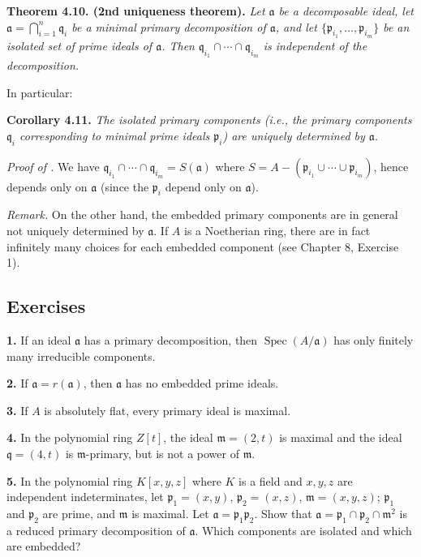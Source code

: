 \noindent\textbf{Theorem 4.10. (2nd uniqueness theorem).} \emph{Let \(\mathfrak a\) be a decomposable ideal, let \(\mathfrak a=\bigcap_{i=1}^n\mathfrak q_i\) be a minimal primary decomposition of \(\mathfrak a\), and let \(\{\mathfrak p_{i_1},\ldots,\mathfrak p_{i_m}\}\) be an isolated set of prime ideals of \(\mathfrak a\). Then \(\mathfrak q_{i_1}\cap\cdots\cap\mathfrak q_{i_m}\) is independent of the decomposition.}

In particular:

\noindent\textbf{Corollary 4.11.} \emph{The isolated primary components (i.e., the primary components \(\mathfrak q_i\) corresponding to minimal prime ideals \(\mathfrak p_i\)) are uniquely determined by \(\mathfrak a\).}

\noindent\emph{Proof of .} We have \(\mathfrak q_{i_1}\cap\cdots\cap\mathfrak q_{i_m}=S(\mathfrak a)\) where \(S=A-(\mathfrak p_{i_1}\cup\cdots\cup\mathfrak p_{i_m})\), hence depends only on \(\mathfrak a\) (since the \(\mathfrak p_i\) depend only on \(\mathfrak a\)). \proofbox

\noindent\emph{Remark.} On the other hand, the embedded primary components are in general not uniquely determined by \(\mathfrak a\). If \(A\) is a Noetherian ring, there are in fact infinitely many choices for each embedded component (see Chapter 8, Exercise 1).

\subsection{Exercises}

\noindent\textbf{1.} If an ideal \(\mathfrak a\) has a primary decomposition, then \(\operatorname{Spec}(A/\mathfrak a)\) has only finitely many irreducible components.

\noindent\amstar\textbf{2.} If \(\mathfrak a=r(\mathfrak a)\), then \(\mathfrak a\) has no embedded prime ideals.

\noindent\textbf{3.} If \(A\) is absolutely flat, every primary ideal is maximal.

\noindent\textbf{4.} In the polynomial ring \(Z[t]\), the ideal \(\mathfrak m=(2,t)\) is maximal and the ideal \(\mathfrak q=(4,t)\) is \(\mathfrak m\)-primary, but is not a power of \(\mathfrak m\).

\noindent\textbf{5.} In the polynomial ring \(K[x,y,z]\) where \(K\) is a field and \(x,y,z\) are independent indeterminates, let \(\mathfrak p_1=(x,y)\), \(\mathfrak p_2=(x,z)\), \(\mathfrak m=(x,y,z)\); \(\mathfrak p_1\) and \(\mathfrak p_2\) are prime, and \(\mathfrak m\) is maximal. Let \(\mathfrak a=\mathfrak p_1\mathfrak p_2\). Show that \(\mathfrak a=\mathfrak p_1\cap\mathfrak p_2\cap\mathfrak m^2\) is a reduced primary decomposition of \(\mathfrak a\). Which components are isolated and which are embedded?

